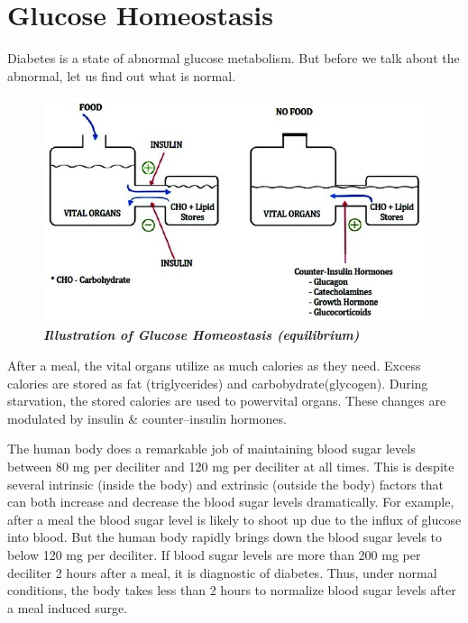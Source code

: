 \chapter{Glucose Homeostasis}\label{chap2}

Diabetes is a state of abnormal glucose metabolism. But before we talk about the abnormal, let us find out what is normal.

\vskip 10pt

\begin{figure}[h]
\centering
\includegraphics[scale=2.5]{images/017.jpg}\\
\textit{\textbf{Illustration of Glucose Homeostasis (equilibrium)}}
\end{figure}

After a meal, the vital organs utilize as much calories as they need. Excess calories are stored as fat (triglycerides) and carbobydrate\break (glycogen). During starvation, the stored calories are used to power\break vital organs. These changes are modulated by insulin \& counter–insu\-lin hormones.

The human body does a remarkable job of maintaining blood sugar levels between 80 mg per deciliter and 120 mg per deciliter at all times.
 This is despite several intrinsic (inside the body) and extrinsic (outside the body) factors that can both increase and decrease the blood sugar levels dramatically. For example, after a meal the blood sugar level is likely to shoot up due to the influx of glucose into blood. But the human body rapidly brings down the blood sugar levels to below 120 mg per deciliter. If blood sugar levels are more than 200 mg per deciliter 2 hours after a meal, it is diagnostic of diabetes. Thus, under normal conditions, the body takes less than 2 hours to normalize blood sugar levels after a meal induced surge.

